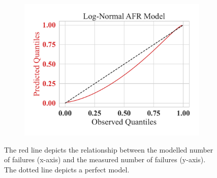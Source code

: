 \documentclass[conference]{IEEEtran}
\begin{document}
\begin{figure}[h!]
\begin{subfigure}[b]{.3\linewidth}
        \includegraphics[width=\linewidth,clip]{plots/combined/log_normal_qq.pdf}
        \caption{}
    \end{subfigure}
    \caption{The red line depicts the relationship between the modelled number of failures (x-axis) and the measured number of failures (y-axis). The dotted line depicts a perfect model.}
    \label{fig:qq}
\end{figure}
\end{document}
